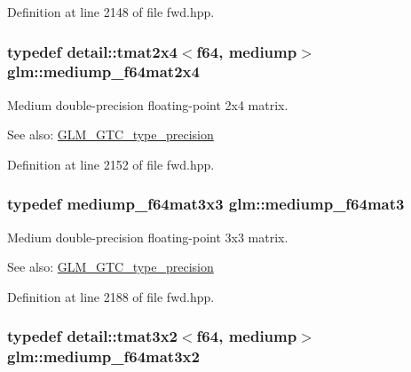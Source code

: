 Definition at line 2148 of file fwd.hpp.\hypertarget{group__gtc__type__precision_g65c67789f7e2ff605d8f48dc3750a515}{
\subsubsection[mediump\_\-f64mat2x4]{\setlength{\rightskip}{0pt plus 5cm}typedef detail::tmat2x4$<$f64, mediump$>$ {\bf glm::mediump\_\-f64mat2x4}}}
\label{group__gtc__type__precision_g65c67789f7e2ff605d8f48dc3750a515}


Medium double-precision floating-point 2x4 matrix. \begin{Desc}
\item[See also:]\hyperlink{group__gtc__type__precision}{GLM\_\-GTC\_\-type\_\-precision} \end{Desc}


Definition at line 2152 of file fwd.hpp.\hypertarget{group__gtc__type__precision_ge38a4a0b57e25d9cbb153dcaab9432ec}{
\subsubsection[mediump\_\-f64mat3]{\setlength{\rightskip}{0pt plus 5cm}typedef mediump\_\-f64mat3x3 {\bf glm::mediump\_\-f64mat3}}}
\label{group__gtc__type__precision_ge38a4a0b57e25d9cbb153dcaab9432ec}


Medium double-precision floating-point 3x3 matrix. \begin{Desc}
\item[See also:]\hyperlink{group__gtc__type__precision}{GLM\_\-GTC\_\-type\_\-precision} \end{Desc}


Definition at line 2188 of file fwd.hpp.\hypertarget{group__gtc__type__precision_gd6408472435fce994a3bb9d14d321ddd}{
\subsubsection[mediump\_\-f64mat3x2]{\setlength{\rightskip}{0pt plus 5cm}typedef detail::tmat3x2$<$f64, mediump$>$ {\bf glm::mediump\_\-f64mat3x2}}}
\label{group__gtc__type__precision_gd6408472435fce994a3bb9d14d321ddd}


